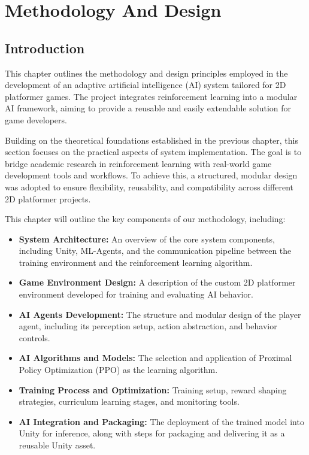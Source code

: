 \documentclass[12pt,oneside,openright,a4paper]{cpe-english-project}
\begin{document}
\chapter{Methodology And Design}

\section{Introduction}

This chapter outlines the methodology and design principles employed in the development of an adaptive artificial intelligence (AI) system tailored for 2D platformer games. The project integrates reinforcement learning into a modular AI framework, aiming to provide a reusable and easily extendable solution for game developers.\par

Building on the theoretical foundations established in the previous chapter, this section focuses on the practical aspects of system implementation. The goal is to bridge academic research in reinforcement learning with real-world game development tools and workflows. To achieve this, a structured, modular design was adopted to ensure flexibility, reusability, and compatibility across different 2D platformer projects.\par

This chapter will outline the key components of our methodology, including:

\begin{itemize}
\item \textbf{System Architecture:} An overview of the core system components, including Unity, ML-Agents, and the communication pipeline between the training environment and the reinforcement learning algorithm.
\item \textbf{Game Environment Design:} A description of the custom 2D platformer environment developed for training and evaluating AI behavior.
\item \textbf{AI Agents Development:} The structure and modular design of the player agent, including its perception setup, action abstraction, and behavior controls.
\item \textbf{AI Algorithms and Models:} The selection and application of Proximal Policy Optimization (PPO) as the learning algorithm.
\item \textbf{Training Process and Optimization:} Training setup, reward shaping strategies, curriculum learning stages, and monitoring tools.
\item \textbf{AI Integration and Packaging:} The deployment of the trained model into Unity for inference, along with steps for packaging and delivering it as a reusable Unity asset.
\end{itemize}
\end{document}
